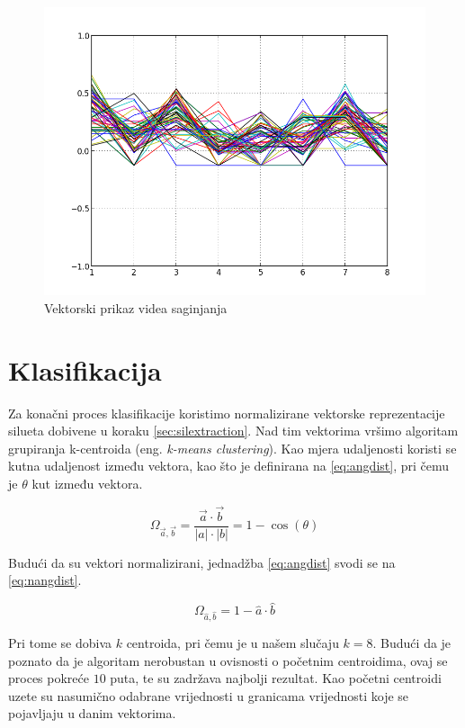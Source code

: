 \documentclass[times, utf8, diplomski]{fer}
\newcommand{\eng}[1]{(eng. \textit{#1})}
\begin{document}
\begin{figure}[ht]
\centering
\includegraphics[scale=0.7]{vecbend.png}
\caption{Vektorski prikaz videa saginjanja}
\label{img:vecbend}
\end{figure}

\section{Klasifikacija}

Za konačni proces klasifikacije koristimo normalizirane vektorske reprezentacije silueta dobivene u koraku \ref{sec:silextraction}. Nad tim vektorima vršimo algoritam grupiranja k-centroida \eng{k-means clustering}. Kao mjera udaljenosti koristi se kutna udaljenost između vektora, kao što je definirana na \ref{eq:angdist}, pri čemu je $\theta$ kut između vektora.

\begin{equation} \label{eq:angdist}
\Omega_{\vec{a},\vec{b}} = \frac{\vec{a} \cdot \vec{b}}{|a| \cdot |b|} = 1 - \cos(\theta)
\end{equation}

Budući da su vektori normalizirani, jednadžba \ref{eq:angdist} svodi se na \ref{eq:nangdist}.

\begin{equation} \label{eq:nangdist}
\Omega_{\hat{a},\hat{b}} = 1 - \hat{a} \cdot \hat{b}
\end{equation}

Pri tome se dobiva $k$ centroida, pri čemu je u našem slučaju $k = 8$. Budući da je poznato da je algoritam nerobustan u ovisnosti o početnim centroidima, ovaj se proces pokreće $10$ puta, te su zadržava najbolji rezultat. Kao početni centroidi uzete su nasumično odabrane vrijednosti u granicama vrijednosti koje se pojavljaju u danim vektorima.
\end{document}
